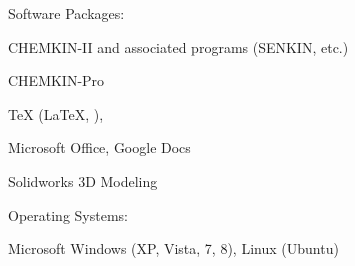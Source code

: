\halfblankline

Software Packages:
%
\begin{innerlist}
    \item CHEMKIN-II and associated programs (SENKIN, etc.)
    \item CHEMKIN-Pro
    \item \TeX{} (\LaTeX{}, \BibTeX{}),
    \item Microsoft Office, Google Docs
    \item Solidworks 3D Modeling
\end{innerlist}

\halfblankline

Operating Systems:
%
\begin{innerlist}
    \item Microsoft Windows (XP, Vista, 7, 8), Linux (Ubuntu)
\end{innerlist}





